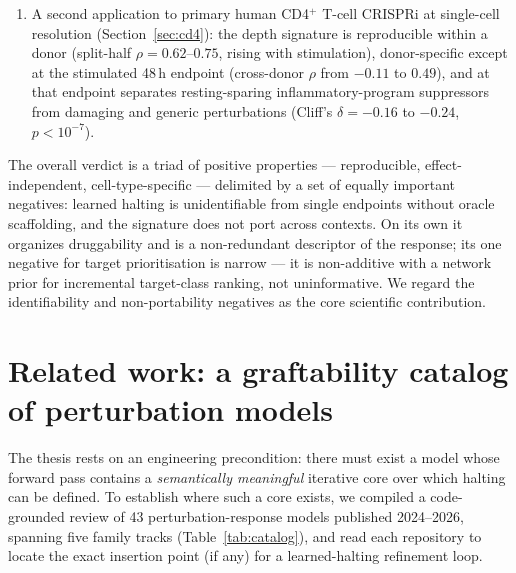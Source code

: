 \documentclass[11pt]{article}
\let\mathrho\rho
\renewcommand{\rho}{\ensuremath{\mathrho}}
\begin{document}
\begin{enumerate}[leftmargin=1.4em,itemsep=1pt]
Section~\ref{sec:grn}). The only negative is narrow: for one incremental target-\emph{class} ranking
task it is non-additive with a STRING prior built from the same modules (three of four lines;
Section~\ref{sec:drug}).
\item A second application to primary human CD4$^+$ T-cell CRISPRi at single-cell resolution
(Section~\ref{sec:cd4}): the depth signature is reproducible within a donor (split-half
\rho{}$=0.62$--$0.75$, rising with stimulation), donor-specific except at the stimulated 48\,h
endpoint (cross-donor \rho{} from $-0.11$ to $0.49$), and at that endpoint separates
resting-sparing inflammatory-program suppressors from damaging and generic perturbations
(Cliff's $\delta=-0.16$ to $-0.24$, $p<10^{-7}$).
\end{enumerate}

The overall verdict is a triad of positive properties --- reproducible, effect-independent,
cell-type-specific --- delimited by a set of equally important negatives: learned halting is
unidentifiable from single endpoints without oracle scaffolding, and the signature does not port
across contexts. On its own it organizes druggability and is a non-redundant descriptor of the
response; its one negative for target prioritisation is narrow --- it is non-additive with a network
prior for incremental target-class ranking, not uninformative. We regard the identifiability and
non-portability negatives as the core scientific contribution.

\section{Related work: a graftability catalog of perturbation models}
\label{sec:related}

The thesis rests on an engineering precondition: there must exist a model whose forward pass
contains a \emph{semantically meaningful} iterative core over which halting can be defined. To
establish where such a core exists, we compiled a code-grounded review of 43 perturbation-response
models published 2024--2026, spanning five family tracks
(Table~\ref{tab:catalog}), and read each repository to locate the exact insertion point (if any)
for a learned-halting refinement loop.
\end{document}
